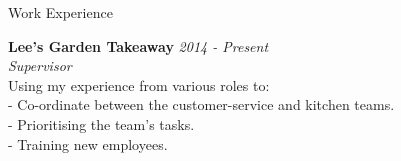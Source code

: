 \documentclass{resume} %
\begin{document}
\begin{rSection}{Work Experience}

{\bf Lee's Garden Takeaway } \hfill {\em 2014 - Present} 
\\{\textit{Supervisor}}
\\Using my experience from various roles to: 
\\- Co-ordinate between the customer-service and kitchen teams.
\\- Prioritising the team's tasks.
\\- Training new employees.

\end{rSection}



\end{document}
